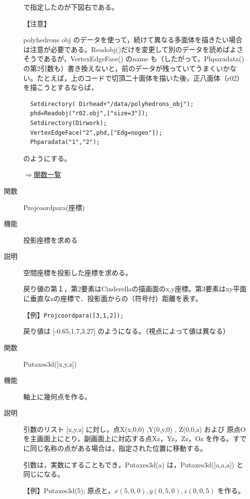 \documentclass[papersize,a4paper,12pt,uplatex]{jsarticle}
\begin{document}
\begin{description}
で指定したのが下図右である。

 \begin{center}     \end{center}

【注意】

  polyhedrons obj のデータを使って，続けて異なる多面体を描きたい場合は注意が必要である。Readobj()だけを変更して別のデータを読めばよさそうであるが，VertexEdgeFace() のname も（したがって，Phparadata()の第2引数も）書き換えないと，前のデータが残っていてうまくいかない。たとえば，上のコードで切頂二十面体を描いた後，正八面体（r02）を描こうとするならば，
\begin{verbatim}
  Setdirectory( Dirhead+"/data/polyhedrons_obj");
  phd=Readobj("r02.obj",["size=3"]);
  Setdirectory(Dirwork);
  VertexEdgeFace("2",phd,["Edg=nogeo"]);
  Phparadata("1","2");
\end{verbatim}
  のようにする。
  

\begin{flushright} \hyperlink{functionlist}{$\Rightarrow$関数一覧}\end{flushright}

\hypertarget{projcoordpara}{}
\item[関数]  Projcoordpara(座標)
\item[機能]  投影座標を求める
\item[説明]  空間座標を投影した座標を求める。

戻り値の第１，第2要素はCinderellaの描画面のx,y座標。第3要素はxy平面に垂直なzの座標で．投影面からの（符号付）距離を表す。

\vspace{\baselineskip}
【例】\verb|Projcoordpara([3,1,2]);|

 戻り値は  [-0.65,1.7,3.27]   のようになる。（視点によって値は異なる）


\vspace{\baselineskip}
\hypertarget{putaxes3d}{}
\item[関数]  Putaxes3d([x,y,z])
\item[機能]  軸上に幾何点を作る。
\item[説明]  引数のリスト [x,y,z] に対し，点X(x,0,0) ,Y(0,y,0) , Z(0,0,z) および 原点Oを主画面上にとり，副画面上に対応する点Xz，Yz，Zz，Oz を作る。すでに同じ名称の点がある場合は，指定された位置に移動する。

引数は，実数にすることもでき，Putaxes3d(a) は，Putaxes3d([a,a,a]) と同じになる。
  
\vspace{\baselineskip}
【例】Putaxes3d(5);  原点と，$x(5,0,0),y(0,5,0),z(0,0,5)$ を作る。


\end{description}
\end{document}
